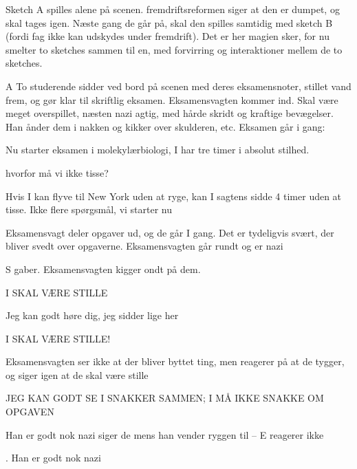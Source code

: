 \documentclass[a4paper,11pt]{article}
\begin{document}
\begin{sketch}


\scene Sketch A spilles alene på scenen. fremdriftsreformen siger at den er dumpet, og skal tages igen. 
Næste gang de går på, skal den spilles samtidig med sketch B (fordi fag ikke kan udskydes under fremdrift). 
Det er her magien sker, for nu smelter to sketches sammen til en, med forvirring og interaktioner mellem de to sketches. 


\scene A
To studerende sidder ved bord på scenen med deres eksamensnoter, stillet vand frem, og gør klar til skriftlig eksamen.
Eksamensvagten kommer ind. Skal være meget overspillet, næsten nazi agtig, med hårde skridt og kraftige bevægelser.
Han ånder dem i nakken og kikker over skulderen, etc.
Eksamen går i gang:

 Nu starter eksamen i molekylærbiologi, I har tre timer i absolut stilhed.


 hvorfor må vi ikke tisse?


 Hvis I kan flyve til New York uden at ryge, kan I sagtens sidde 4 timer uden at tisse. Ikke flere spørgsmål, vi starter nu

 

\scene Eksamensvagt deler opgaver ud, og de går I gang. Det er tydeligvis svært, der bliver svedt over opgaverne.
Eksamensvagten går rundt og er nazi

S gaber. Eksamensvagten kigger ondt på dem.

 I SKAL VÆRE STILLE

 Jeg kan godt høre dig, jeg sidder lige her

 I SKAL VÆRE STILLE!

 

\scene Eksamensvagten ser ikke at der bliver byttet ting, men reagerer på at de tygger, og siger igen at de skal være stille

 JEG KAN GODT SE I SNAKKER SAMMEN; I MÅ IKKE SNAKKE OM OPGAVEN

\scene Han er godt nok nazi siger de mens han vender ryggen til – E reagerer ikke


. Han er godt nok nazi


\end{sketch}
\end{document}

